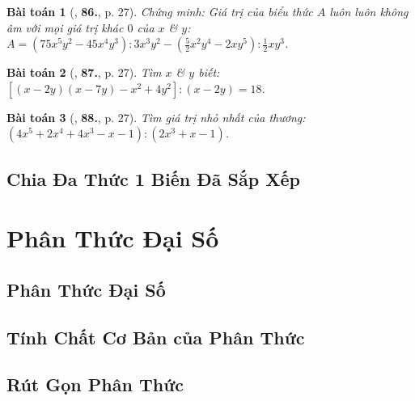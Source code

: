 \documentclass{article}
\numberwithin{equation}{section}
\newtheorem{baitoan}{Bài toán}[section]
\begin{document}
\begin{baitoan}[\cite{Tuyen_Toan_8}, \textbf{86.}, p. 27]
	Chứng minh: Giá trị của biểu thức $A$ luôn luôn không âm với mọi giá trị khác $0$ của $x$ \& $y$: $A = (75x^5y^2 - 45x^4y^3):3x^3y^2 - \left(\frac{5}{2}x^2y^4 - 2xy^5\right):\frac{1}{2}xy^3$.
\end{baitoan}

\begin{baitoan}[\cite{Tuyen_Toan_8}, \textbf{87.}, p. 27]
	Tìm $x$ \& $y$ biết: $[(x - 2y)(x - 7y) - x^2 + 4y^2]:(x - 2y) = 18$.
\end{baitoan}

\begin{baitoan}[\cite{Tuyen_Toan_8}, \textbf{88.}, p. 27]
	Tìm giá trị nhỏ nhất của thương: $(4x^5 + 2x^4 + 4x^3 - x - 1):(2x^3 + x - 1)$.
\end{baitoan}


\subsection{Chia Đa Thức 1 Biến Đã Sắp Xếp}


\section{Phân Thức Đại Số}

\subsection{Phân Thức Đại Số}


\subsection{Tính Chất Cơ Bản của Phân Thức}


\subsection{Rút Gọn Phân Thức}

\end{document}
